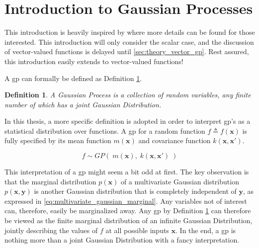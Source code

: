 \section{Introduction to Gaussian Processes}\label{sec:gp}

This introduction is heavily inspired by \cite{rasmussen} where more details can be found for those interested. This introduction will only consider the scalar case, and the discussion of vector-valued functions is delayed until \cref{sec:theory_vector_gp}. Rest assured, this introduction easily extends to vector-valued functions!

A \acrfull{gp} can formally be defined as Definition \ref{def:gp}.

\newtheorem{gp_def}{Definition}
\begin{gp_def}\label{def:gp}
A Gaussian Process is a collection of random variables, any finite number of which has a joint Gaussian Distribution.
\end{gp_def}

In this thesis, a more specific definition is adopted in order to interpret \acrshort{gp}'s as a statistical distribution over functions. A \acrshort{gp} for a random function $f \triangleq f(\boldsymbol{x})$ is fully specified by its mean function $m(\boldsymbol{x})$ and covariance function $k(\boldsymbol{x}, \boldsymbol{x}')$.

\begin{equation}\label{eq:gp}
    f \sim GP(\;m(\boldsymbol{x}), \; k(\boldsymbol{x}, \boldsymbol{x}')\;)
\end{equation}

This interpretation of a \acrshort{gp} might seem a bit odd at first. The key observation is that the marginal distribution $p(\boldsymbol{x})$ of a multivariate Gaussian distribution $p(\boldsymbol{x}, \boldsymbol{y})$ is another Gaussian distribution that is completely independent of $\boldsymbol{y}$, as expressed in \cref{eq:multivariate_gaussian_marginal}. Any variables not of interest can, therefore, easily be marginalized away. Any \acrshort{gp} by Definition \ref{def:gp} can therefore be viewed as the finite marginal distribution of an infinite Gaussian Distribution, jointly describing the values of $f$ at all possible inputs $\boldsymbol{x}$. In the end, a \acrshort{gp} is nothing more than a joint Gaussian Distribution with a fancy interpretation.

